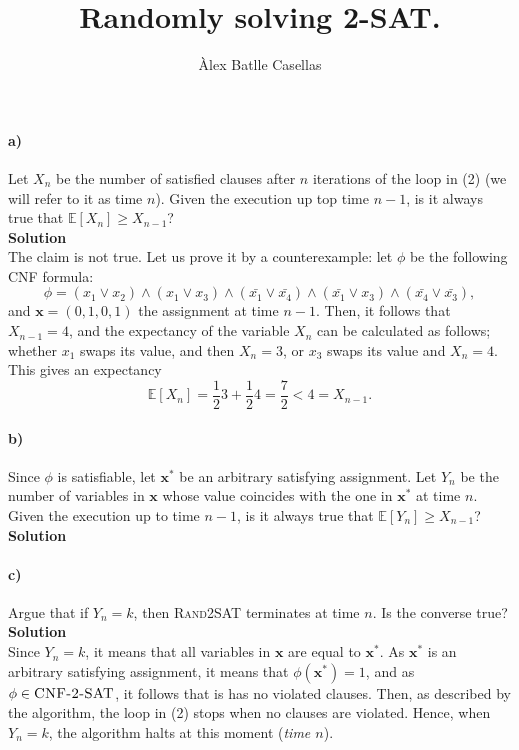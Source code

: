 \documentclass[10pt]{article}
\author{Àlex Batlle Casellas}
\title{Randomly solving \textsc{2-SAT}.}
\date{}
\begin{document}
\maketitle

\paragraph{a)} Let $X_n$ be the number of satisfied clauses after $n$ iterations of the loop in (2) (we will refer to it as time $n$). Given the execution up top time $n-1$, is it always true that $\mathbb{E}\left[X_n\right]\geq X_{n-1}$?\\
\textbf{Solution}\\
The claim is not true. Let us prove it by a counterexample: let $\phi$ be the following CNF formula: \[\phi=(x_1\vee x_2)\wedge(x_1\vee x_3)\wedge(\bar{x_1}\vee\bar{x_4})\wedge(\bar{x_1}\vee x_3)\wedge(\bar{x_4}\vee\bar{x_3}),\] and $\textbf{x}=(0,1,0,1)$ the assignment at time $n-1$. Then, it follows that $X_{n-1}=4$, and the expectancy of the variable $X_n$ can be calculated as follows; whether $x_1$ swaps its value, and then $X_n=3$, or $x_3$ swaps its value and $X_n=4$. This gives an expectancy
\[\mathbb{E}\left[X_n\right]=\dfrac{1}{2}3+\dfrac{1}{2}4=\dfrac{7}{2}<4=X_{n-1}.\]

\paragraph{b)} Since $\phi$ is satisfiable, let $\textbf{x}^*$ be an arbitrary satisfying assignment. Let $Y_n$ be the number of variables in $\textbf{x}$ whose value coincides with the one in $\textbf{x}^*$ at time $n$. Given the execution up to time $n-1$, is it always true that $\mathbb{E}\left[Y_n\right]\geq X_{n-1}$?\\
\textbf{Solution}\\

\paragraph{c)} Argue that if $Y_n=k$, then \textsc{Rand2SAT} terminates at time $n$. Is the converse true?\\
\textbf{Solution}\\
Since $Y_n=k$, it means that all variables in $\textbf{x}$ are equal to $\textbf{x}^*$. As $\textbf{x}^*$ is an arbitrary satisfying assignment, it means that $\phi(\textbf{x}^*)=1$, and as $\phi\in\textsc{CNF-2-SAT}$, it follows that is has no violated clauses. Then, as described by the algorithm, the loop in (2) stops when no clauses are violated. Hence, when $Y_n=k$, the algorithm halts at this moment (\textit{time $n$}).
\end{document}
